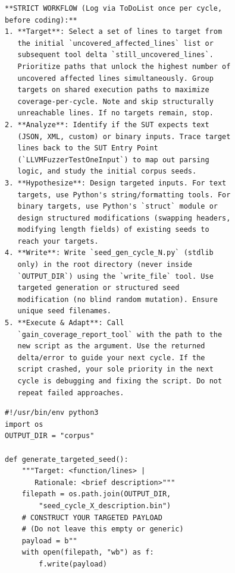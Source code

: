 \begin{figure}[p]
\begin{minipage}[t]{0.485\linewidth}
  \end{minipage}\hfill
  \begin{minipage}[t]{0.485\linewidth}

  \begin{lstlisting}[style=promptstyle,rulecolor=\color{ppFlow}]
**STRICT WORKFLOW (Log via ToDoList once per cycle,
before coding):**
1. **Target**: Select a set of lines to target from
   the initial `uncovered_affected_lines` list or
   subsequent tool delta `still_uncovered_lines`.
   Prioritize paths that unlock the highest number of
   uncovered affected lines simultaneously. Group
   targets on shared execution paths to maximize
   coverage-per-cycle. Note and skip structurally
   unreachable lines. If no targets remain, stop.
2. **Analyze**: Identify if the SUT expects text
   (JSON, XML, custom) or binary inputs. Trace target
   lines back to the SUT Entry Point
   (`LLVMFuzzerTestOneInput`) to map out parsing
   logic, and study the initial corpus seeds.
3. **Hypothesize**: Design targeted inputs. For text
   targets, use Python's string/formatting tools. For
   binary targets, use Python's `struct` module or
   design structured modifications (swapping headers,
   modifying length fields) of existing seeds to
   reach your targets.
4. **Write**: Write `seed_gen_cycle_N.py` (stdlib
   only) in the root directory (never inside
   `OUTPUT_DIR`) using the `write_file` tool. Use
   targeted generation or structured seed
   modification (no blind random mutation). Ensure
   unique seed filenames.
5. **Execute & Adapt**: Call
   `gain_coverage_report_tool` with the path to the
   new script as the argument. Use the returned
   delta/error to guide your next cycle. If the
   script crashed, your sole priority in the next
   cycle is debugging and fixing the script. Do not
   repeat failed approaches.
  \end{lstlisting}

  \begin{lstlisting}[style=promptstyle,rulecolor=\color{ppTemplate}]
#!/usr/bin/env python3
import os
OUTPUT_DIR = "corpus"

def generate_targeted_seed():
    """Target: <function/lines> |
       Rationale: <brief description>"""
    filepath = os.path.join(OUTPUT_DIR,
        "seed_cycle_X_description.bin")
    # CONSTRUCT YOUR TARGETED PAYLOAD
    # (Do not leave this empty or generic)
    payload = b""
    with open(filepath, "wb") as f:
        f.write(payload)


\end{lstlisting}
\end{minipage}
\end{figure}
